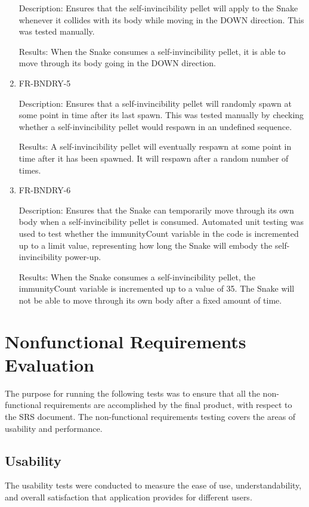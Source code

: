 \documentclass[12pt, titlepage]{article}
\begin{document}
\begin{enumerate}
Description: Ensures that the self-invincibility pellet will apply to the Snake whenever it collides with its body while moving in the DOWN direction. This was tested manually.

Results: When the Snake consumes a self-invincibility pellet, it is able to move through its body going in the DOWN direction.

\item{FR-BNDRY-5}
\label{fr:bndry-5}

Description: Ensures that a self-invincibility pellet will randomly spawn at some point in time after its last spawn. This was tested manually by checking whether 
a self-invincibility pellet would respawn in an undefined sequence.

Results: A self-invincibility pellet will eventually respawn at some point in time after it has been spawned. It will respawn after a random number of times.

\item{FR-BNDRY-6}
\label{fr:bndry-6}

Description: Ensures that the Snake can temporarily move through its own body when a self-invincibility pellet is consumed. Automated unit testing was used to test whether the immunityCount variable in the code is incremented up to a limit value, representing how long the Snake will embody the self-invincibility power-up.

Results: When the Snake consumes a self-invincibility pellet, the immunityCount variable is incremented up to a value of 35. The Snake will not be able to move through its own body after a fixed amount of time.

\end{enumerate}

\section{Nonfunctional Requirements Evaluation}
The purpose for running the following tests was to ensure that all the non-functional requirements are accomplished by the final product, with respect to the SRS document. The non-functional requirements testing covers the areas of usability and performance.

\subsection{Usability}
The usability tests were conducted to measure the ease of use, understandability, and overall satisfaction that application provides for different users.
\end{document}
